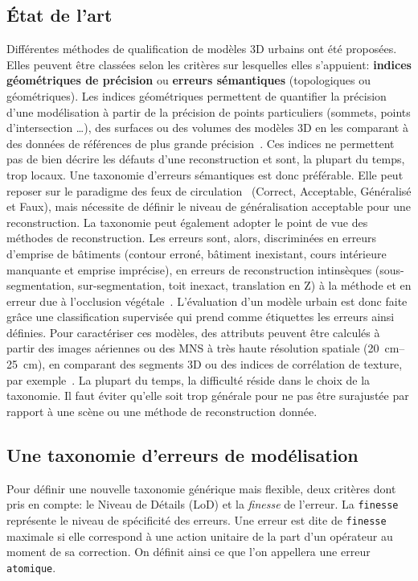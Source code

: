     \subsection*{\'Etat de l'art}
            Différentes méthodes de qualification de modèles 3D urbains ont été proposées.
            Elles peuvent être classées selon les critères sur lesquelles elles s'appuient: \textbf{indices géométriques de précision} ou \textbf{erreurs sémantiques} (topologiques ou géométriques).
            Les indices géométriques permettent de quantifier la précision d'une modélisation à partir de la précision de points particuliers (sommets, points d'intersection \dots), des surfaces ou des volumes des modèles 3D en les comparant à des données de références de plus grande précision~\parencite{zeng2014multicriteria}.
            Ces indices ne permettent pas de bien décrire les défauts d'une reconstruction et sont, la plupart du temps, trop locaux.
            Une taxonomie d'erreurs sémantiques est donc préférable.
            Elle peut reposer sur le paradigme des feux de circulation~\parencite{boudet2006supervised} (Correct, Acceptable, Généralisé et Faux), mais nécessite de définir le niveau de généralisation acceptable pour une reconstruction.
            La taxonomie peut également adopter le point de vue des méthodes de reconstruction. 
            Les erreurs sont, alors, discriminées en erreurs d'emprise de bâtiments (contour erroné, bâtiment inexistant, cours intérieure manquante et emprise imprécise), en erreurs de reconstruction intinsèques (sous-segmentation, sur-segmentation, toit inexact, translation en Z) à la méthode et en erreur due à l'occlusion végétale~\parencite{michelin2013quality}.
            L'évaluation d'un modèle urbain est donc faite grâce une classification supervisée qui prend comme étiquettes les erreurs ainsi définies.
            Pour caractériser ces modèles, des attributs peuvent être calculés à partir des images aériennes ou des MNS à très haute résolution spatiale (\SIrange{20}{25}{\cm}), en comparant des segments 3D ou des indices de corrélation de texture, par exemple~\parencite{boudet2006supervised, michelin2013quality}.
            La plupart du temps, la difficulté réside dans le choix de la taxonomie.
            Il faut éviter qu'elle soit trop générale pour ne pas être surajustée par rapport à une scène ou une méthode de reconstruction donnée.

    \subsection*{Une taxonomie d'erreurs de modélisation}
        Pour définir une nouvelle taxonomie générique mais flexible, deux critères dont pris en compte: le Niveau de Détails (LoD) et la \textit{finesse} de l'erreur.
        La \texttt{finesse} représente le niveau de spécificité des erreurs.
        Une erreur est dite de \texttt{finesse} maximale si elle correspond à une action unitaire de la part d'un opérateur au moment de sa correction.
        On définit ainsi ce que l'on appellera une erreur \texttt{atomique}.\\

